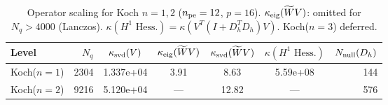 \begin{table}[ht]
\centering
\caption{Operator scaling for Koch $n=1,2$ ($n_{\rm pe}=12$, $p=16$). $\kappa_{\rm eig}(\widetilde{W}V)$: omitted for $N_q>4000$ (Lanczos). $\kappa(H^1\text{ Hess.}) = \kappa(V^T(I+D_h^TD_h)V)$. Koch($n=3$) deferred.}
\label{tab:operator_scaling_hires}
\begin{tabular}{@{}lrccccr@{}}
\toprule
Level & $N_q$ & $\kappa_{\rm svd}(V)$ & $\kappa_{\rm eig}(\widetilde{W}V)$ & $\kappa_{\rm svd}(\widetilde{W}V)$ & $\kappa(H^1\text{ Hess.})$ & $N_{\rm null}(D_h)$ \\
\midrule
  Koch($n=1$) & 2304 & 1.337e+04 & 3.91 & 8.63 & 5.59e+08 & 144 \\
  Koch($n=2$) & 9216 & 5.120e+04 & — & 12.82 & — & 576 \\
\bottomrule
\end{tabular}
\end{table}